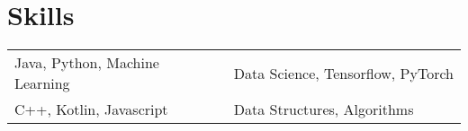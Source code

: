 \documentclass[a12paper]{article}
\begin{document}
\section{Skills}
\begin{tabularx}{\linewidth}{@{}l X@{}}
Java, Python, Machine Learning &  \normalsize{Data Science, Tensorflow, PyTorch}\\
C++, Kotlin, Javascript  &  \normalsize{Data Structures, Algorithms}\\  
\end{tabularx}

\vfill
\end{document}

